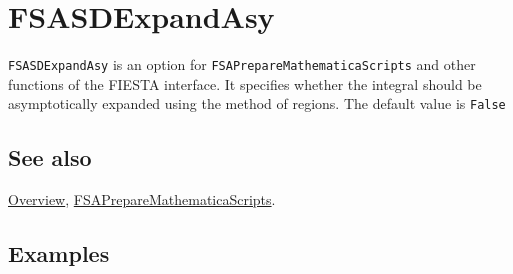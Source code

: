 \documentclass[../FeynHelpersManual.tex]{subfiles}
\begin{document}
\hypertarget{fsasdexpandasy}{
\section{FSASDExpandAsy}\label{fsasdexpandasy}}

\texttt{FSASDExpandAsy} is an option for
\texttt{FSAPrepareMathematicaScripts} and other functions of the FIESTA
interface. It specifies whether the integral should be asymptotically
expanded using the method of regions. The default value is
\texttt{False}

\subsection{See also}

\hyperlink{toc}{Overview},
\hyperlink{fsapreparemathematicascripts}{FSAPrepareMathematicaScripts}.

\subsection{Examples}
\end{document}
